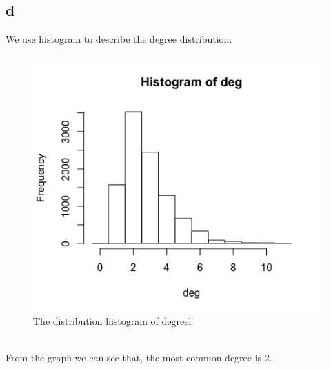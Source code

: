\documentclass{article}
\begin{document}
\subsection{d}
We use histogram to describe the degree distribution.\\
\begin{figure}[htbp]
\centering
\includegraphics[width=.6\textwidth]{figure2d.png}
\caption{The distribution histogram of degreel}
\label{fig:sp_hist}
\end{figure}
\\
From the graph we can see that, the most common degree is 2.
\end{document}
